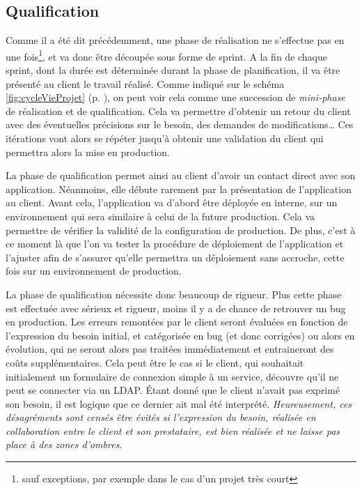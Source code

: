 \subsection{Qualification}

Comme il a été dit précédemment, une phase de réalisation ne s'effectue pas en une fois\footnote{sauf exceptions, par exemple dans le cas d'un projet très court}, et va donc être découpée sous forme de sprint. A la fin de chaque sprint, dont la durée est déterminée durant la phase de planification, il va être présenté au client le travail réalisé. Comme indiqué sur le schéma \ref{fig:cycleVieProjet} (p. \pageref{fig:cycleVieProjet}), on peut voir cela comme une succession de \emph{mini-phase} de réalisation et de qualification. Cela va permettre d'obtenir un retour du client avec des éventuelles précisions sur le besoin, des demandes de modifications\ldots{} Ces itérations vont alors se répéter jusqu'à obtenir une validation du client qui permettra alors la mise en production.

La phase de qualification permet ainsi au client d'avoir un contact direct avec son application. Néanmoins, elle débute rarement par la présentation de l'application au client. Avant cela, l'application va d'abord être déployée en interne, sur un environnement qui sera similaire à celui de la future production. Cela va permettre de vérifier la validité de la configuration de production. De plus, c'est à ce moment là que l'on va tester la procédure de déploiement de l'application et l'ajuster afin de s'assurer qu'elle permettra un déploiement sans accroche, cette fois sur un environnement de production.

La phase de qualification nécessite donc beaucoup de rigueur. Plus cette phase est effectuée avec sérieux et rigueur, moins il y a de chance de retrouver un bug en production. Les erreurs remontées par le client seront évaluées en fonction de l'expression du besoin initial, et catégorisée en bug (et donc corrigées) ou alors en évolution, qui ne seront alors pas traitées immédiatement et entraineront des coûts supplémentaires. Cela peut être le cas si le client, qui souhaitait initialement un formulaire de connexion simple à un service, découvre qu'il ne peut se connecter via un \gls{LDAP}. Étant donné que le client n'avait pas exprimé son besoin, il est logique que ce dernier ait mal été interprété. \emph{Heureusement, ces désagréments sont censés être évités si l'expression du besoin, réalisée en collaboration entre le client et son prestataire, est bien réalisée et ne laisse pas place à des zones d'ombres.}

